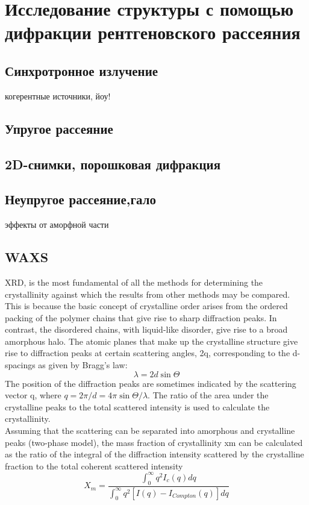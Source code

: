 \section{Исследование структуры с помощью дифракции рентгеновского рассеяния}

\subsection{Синхротронное излучение}
когерентные источники, йоу!
\subsection{Упругое рассеяние}
\subsection{2D-снимки, порошковая дифракция}
\subsection{Неупругое рассеяние,гало}
эффекты от аморфной части
\subsection{WAXS}
XRD, is the most fundamental of all
the methods for determining the crystallinity against which the results from
other methods may be compared.\\
This is because the basic concept of crystalline
order arises from the ordered packing of the polymer chains that give rise to sharp
diffraction peaks. In contrast, the disordered chains, with liquid-like disorder, give
rise to a broad amorphous halo. The atomic planes that make up the crystalline
structure give rise to diffraction peaks at certain scattering angles, 2q, corresponding
to the d-spacings as given by Bragg’s law:
\[
\lambda = 2d \sin \Theta
\]
The position of the diffraction peaks are sometimes indicated by the scattering vector q, where $q = 2\pi/d = 4\pi \sin \Theta / \lambda$. The ratio of the area under the crystalline peaks
to the total scattered intensity is used to calculate the crystallinity.\\
Assuming that the scattering can be separated into amorphous and crystalline
peaks (two-phase model), the mass fraction of crystallinity xm can be calculated
as the ratio of the integral of the diffraction intensity scattered by the crystalline fraction
to the total coherent scattered intensity
\[
X_m = \frac{\int_0^{\infty} q^2 I_c(q) dq}{\int_0^{\infty} q^2 [I(q) - I_{Compton}(q)] dq}
\]


